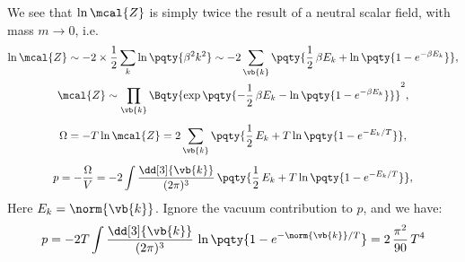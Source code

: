 \documentclass[a4paper,10pt]{article}
\begin{document}
	We see that $\ln\mcal{Z}$ is simply twice the result of a neutral scalar field, with mass $m\to 0$, i.e.\ %
	\begin{gather}
		\ln \mcal{Z}
		\sim -2\times \frac{1}{2}
			\sum_k \ln \pqty{\beta^2 k^2}
		\sim -2\sum_{\vb{k}} \pqty{
			\frac{1}{2}\,\beta E_k
			+ \ln \pqty{
				1 - e^{-\beta E_k}
			}
		}, \\
		\mcal{Z}
		\sim \prod_{\vb{k}} \Bqty{
			\exp\pqty{
				- \frac{1}{2}\,\beta E_k
				- \ln \pqty{
					1 - e^{-\beta E_k}
				}
			}
		}^{2}, \\[1ex]
		\Omega
		= -T\ln \mcal{Z}
		= 2\sum_{\vb{k}} \pqty{
				\frac{1}{2}\,E_k
				+ T\ln \pqty{
					1 - e^{-E_k/T}
				}
			}, \\[1ex]
		p = -\frac{\Omega}{V}
		= -2 \int \frac{\dd[3]{\vb{k}}}{(2\pi)^3}\,
			\pqty{
				\frac{1}{2}\,E_k
				+ T\ln \pqty{
					1 - e^{-E_k/T}
				}
			},
	\end{gather}
	Here $E_k = \norm{\vb{k}}$. Ignore the vacuum contribution to $p$, and we have:
	\begin{equation}
		p = -2T 
		\int \frac{\dd[3]{\vb{k}}}{(2\pi)^3}\,
			\ln \pqty{
				1 - e^{-\norm{\vb{k}}/T}
			}
		= 2\,\frac{\pi^2}{90}\,T^4
	\end{equation}
\end{document}
